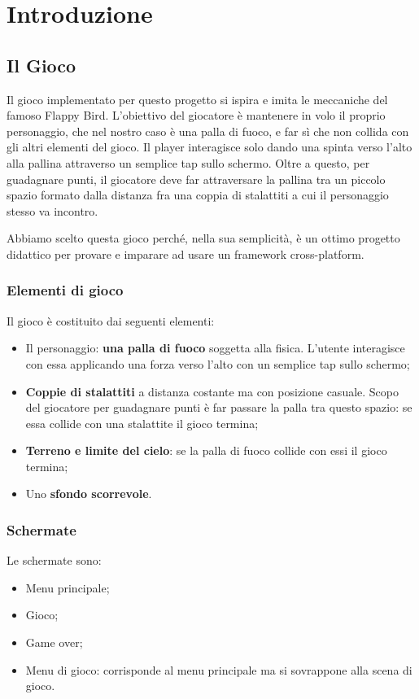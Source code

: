 \section{Introduzione}

	\subsection{Il Gioco}
		Il gioco implementato per questo progetto si ispira e imita le meccaniche del famoso  Flappy Bird. L'obiettivo del giocatore è mantenere in volo il proprio personaggio, che nel nostro caso è una palla di fuoco, e far sì che non collida con gli altri elementi del gioco. Il player interagisce solo dando una spinta verso l'alto alla pallina attraverso un semplice tap sullo schermo. Oltre a questo, per guadagnare punti, il giocatore deve far attraversare la pallina tra un piccolo spazio formato dalla distanza fra una coppia di stalattiti a cui il personaggio stesso va incontro.
		
		Abbiamo scelto questa gioco perché, nella sua semplicità, è un ottimo progetto didattico per provare e imparare ad usare un framework cross-platform.
			
		\subsubsection{Elementi di gioco}
			Il gioco è costituito dai seguenti elementi:
			\begin{itemize}
				\item Il personaggio: \textbf{una palla di fuoco} soggetta alla fisica. L'utente interagisce con essa applicando una forza verso l'alto con un semplice tap sullo schermo;
				\item \textbf{Coppie di stalattiti} a distanza costante ma con posizione casuale. Scopo del giocatore per guadagnare punti è far passare la palla tra questo spazio: se essa collide con una stalattite il gioco termina;
				\item \textbf{Terreno e limite del cielo}: se la palla di fuoco collide con essi il gioco termina;
				\item Uno \textbf{sfondo scorrevole}.
			\end{itemize}
		
		\subsubsection{Schermate}
			Le schermate sono:
			\begin{itemize}
				\item Menu principale;
				\item Gioco;
				\item Game over;
				\item Menu di gioco: corrisponde al menu principale ma si sovrappone alla scena di gioco.
			\end{itemize}
		
